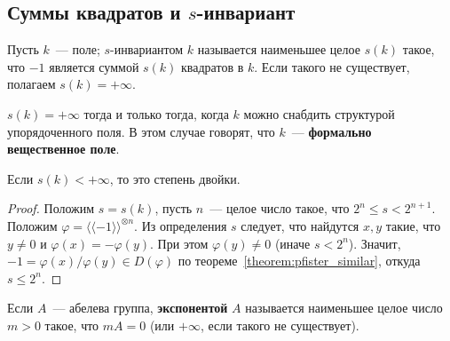 \documentclass[a4paper,oneside,12pt]{article}
\theoremstyle{plain} { \swapnumbers
\newtheorem{theorem}{Теорема}[subsection]
\newtheorem{corollary}[theorem]{Следствие}
\newtheorem{lemma}[theorem]{Лемма}
\newtheorem{proposition}[theorem]{Утверждение}
\newtheorem{claim}[theorem]{Факт}
}
\theoremstyle{definition} { \swapnumbers
\newtheorem{definition}[theorem]{Определение}
\newtheorem{notation}[theorem]{Обозначение}
\newtheorem{remark}[theorem]{Замечание}
\newtheorem{remarks}[theorem]{Замечания}
\newtheorem{example}[theorem]{Пример}
\newtheorem{examples}[theorem]{Примеры}
\newtheorem{sssection}[theorem]{}
}
\def\ph{\varphi}
\def\la{\langle}
\def\ra{\rangle}
\def\lla{\la\!\la}
\def\rra{\ra\!\ra}
\begin{document}
\subsection{Суммы квадратов и $s$-инвариант}

\begin{definition}
Пусть $k$~--- поле; $s$-инвариантом $k$ называется наименьшее целое $s(k)$ такое, что $-1$
является суммой $s(k)$ квадратов в $k$. Если такого не существует, полагаем $s(k)=+\infty$.
\end{definition}
\begin{theorem}
$s(k)=+\infty$ тогда и только тогда, когда $k$ можно снабдить структурой упорядоченного поля. В этом случае говорят,
что $k$~--- {\bf формально вещественное поле}.
\end{theorem}

\begin{theorem}
Если $s(k)<+\infty$, то это степень двойки.
\end{theorem}
\begin{proof}
Положим $s=s(k)$, пусть $n$~--- целое число такое, что $2^n\leq s<2^{n+1}$. Положим $\ph=\lla -1\rra^{\otimes n}$.
Из определения $s$ следует, что найдутся $x,y$ такие, что $y\neq 0$ и $\ph(x)=-\ph(y)$. При этом $\ph(y)\neq 0$
(иначе $s<2^n$). Значит, $-1=\ph(x)/\ph(y)\in D(\ph)$ по теореме~\ref{theorem:pfister_similar}, откуда $s\leq 2^n$.
\end{proof}





\begin{definition}
Если $A$~--- абелева группа, {\bf экспонентой} $A$ называется наименьшее целое число $m>0$ такое, что $mA=0$
(или $+\infty$, если такого не существует).
\end{definition}
\end{document}
